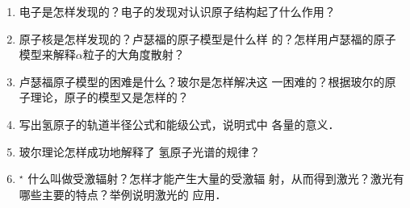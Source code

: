 \begin{enumerate}
    \item 电子是怎样发现的？电子的发现对认识原子结构起了什么作用？
    \item 原子核是怎样发现的？卢瑟福的原子模型是什么样
的？怎样用卢瑟福的原子模型来解释$\alpha$粒子的大角度散射？
\item 卢瑟福原子模型的困难是什么？玻尔是怎样解决这
一困难的？根据玻尔的原子理论，原子的模型又是怎样的？
\item 写出氢原子的轨道半径公式和能级公式，说明式中
各量的意义．
\item 玻尔理论怎样成功地解释了	氢原子光谱的规律？
\item$^\star$ 什么叫做受激辐射？怎样才能产生大量的受激辐
射，从而得到激光？激光有哪些主要的特点？举例说明激光的
应用．
\end{enumerate}



